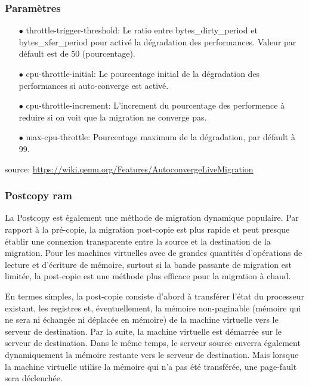 \subsubsection*{Paramètres}
\begin{itemize}
    
 \item[$\bullet$]throttle-trigger-threshold: Le ratio entre bytes\_dirty\_period et bytes\_xfer\_period
                              pour activé la dégradation des performances.
                              Valeur par défault est de 50 (pourcentage).

 \item[$\bullet$]cpu-throttle-initial: Le pourcentage initial de la dégradation des performances si auto-converge est activé.


 \item[$\bullet$]cpu-throttle-increment: L'increment du pourcentage des performence à reduire si on voit que la migration ne converge pas.

 \item[$\bullet$]max-cpu-throttle: Pourcentage maximum de la dégradation, par défault à 99.
\end{itemize}

source:  \url{https://wiki.qemu.org/Features/AutoconvergeLiveMigration}

\subsubsection*{Postcopy ram}
La Postcopy est également une méthode de migration dynamique populaire.
Par rapport à la pré-copie, la migration post-copie est plus rapide et peut presque établir une connexion transparente entre la source et la destination de la migration.
Pour les machines virtuelles avec de grandes quantités d'opérations de lecture et d'écriture de mémoire, surtout si la bande passante de migration est limitée, la post-copie est une méthode plus efficace pour la migration à chaud.

En termes simples, la post-copie consiste d'abord à transférer l'état du processeur existant, les registres et, éventuellement, la mémoire non-paginable (mémoire qui ne sera ni échangée ni déplacée en mémoire) de la machine virtuelle vers le serveur de destination.
Par la suite, la machine virtuelle est démarrée sur le serveur de destination.
Dans le même temps, le serveur source enverra également dynamiquement la mémoire restante vers le serveur de destination.
Mais lorsque la machine virtuelle utilise la mémoire qui n'a pas été transférée, une page-fault sera déclenchée.

